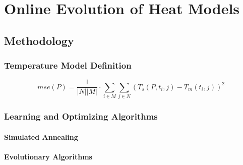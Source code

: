 
\chapter{Online Evolution of Heat Models}
\label{ch:onlineevo}


\section{Methodology}
\subsection{Temperature Model Definition}

\begin{equation}
\label{eq:mse}
mse(P)=\frac{1}{|N||M|} \cdot \sum_{i\in M} \sum_{j\in N} (T_s(P,t_i,j)-T_m(t_i,j))^2
\end{equation}

\subsection{Learning and Optimizing Algorithms}
\subsubsection{Simulated Annealing}

\subsubsection{Evolutionary Algorithms}